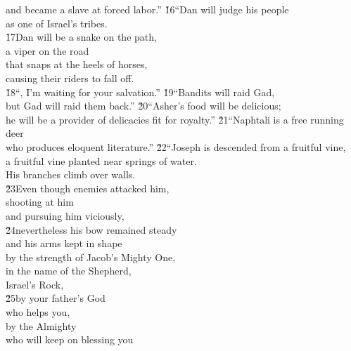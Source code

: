 \begin{poetry}
\poemlll       and became a slave at forced labor.''
\poeml \v{16}``Dan will judge his people \\
\poemll    as one of Israel's tribes. \\
\poeml \v{17}Dan will be a snake on the path, \\
\poemll    a viper on the road \\
\poeml that snaps at the heels of horses, \\
\poemll    causing their riders to fall off. \\
\poeml \v{18}``, I'm waiting for your salvation.''
\poeml \v{19}``Bandits will raid Gad, \\
\poemll    but Gad will raid them back.''
\poeml \v{20}``Asher's food will be delicious; \\
\poemll    he will be a provider of delicacies fit for royalty.''
\poeml \v{21}``Naphtali is a free running deer \\
\poemll    who produces eloquent literature.''
\poeml \v{22}``Joseph is descended from a fruitful vine, \\
\poemll    a fruitful vine planted near springs of water. \\
\poemlll       His branches climb over walls. \\
\poeml \v{23}Even though enemies attacked him, \\
\poemll    shooting at him \\
\poemlll       and pursuing him viciously, \\
\poeml \v{24}nevertheless his bow remained steady \\
\poemll    and his arms kept in shape \\
\poemlll       by the strength of Jacob's Mighty One, \\
\poeml in the name of the Shepherd, \\
\poemll    Israel's Rock, \\
\poeml \v{25}by your father's God \\
\poemll    who helps you, \\
\poeml by the Almighty \\
\poemll    who will keep on blessing you \\

\end{poetry}
